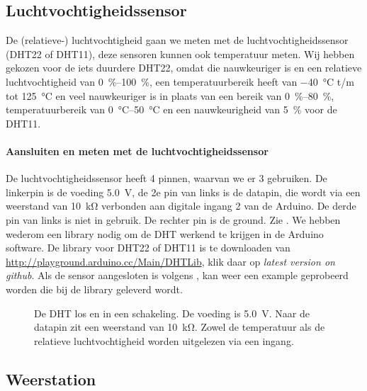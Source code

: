 \subsection{Luchtvochtigheidssensor}

De (relatieve-) luchtvochtigheid gaan we meten met de
luchtvochtigheidssensor (DHT22 of DHT11), deze sensoren kunnen ook
temperatuur meten. Wij hebben gekozen voor de iets duurdere DHT22, omdat
die nauwkeuriger is en een relatieve luchtvochtigheid van
\SIrange{0}{100}{\percent}, een temperatuurbereik heeft van
\SI{-40}{\degreeCelsius} t/m tot \SI{125}{\degreeCelsius} en veel
nauwkeuriger is in plaats van een bereik van \SIrange{0}{80}{\percent},
temperatuurbereik van \SIrange{0}{50}{\degreeCelsius} en een
nauwkeurigheid van \SI{5}{\percent} voor de DHT11.

\paragraph{Aansluiten en meten met de luchtvochtigheidssensor}

De luchtvochtigheidssensor heeft 4 pinnen, waarvan we er 3 gebruiken. De
linkerpin is de voeding \SI{5.0}{\volt}, de 2e pin van links is de
datapin, die wordt via een weerstand van \SI{10}{\kilo\ohm} verbonden
aan digitale ingang 2 van de Arduino. De derde pin van links is niet in
gebruik. De rechter pin is de ground. Zie . We hebben
wederom een library nodig om de DHT werkend te krijgen in de Arduino
software. De library voor DHT22 of DHT11 is te downloaden van
\url{http://playground.arduino.cc/Main/DHTLib}, klik daar op
\emph{latest version on github}. Als de sensor aangesloten is volgens
, kan weer een example geprobeerd
worden die bij de library geleverd wordt.

\begin{figure}
    \centering
    \hfill
    \caption{De DHT los en in een schakeling. De voeding is \SI{5.0}{\volt}. 
    Naar de datapin zit een weerstand van \SI{10}{\kilo\ohm}. Zowel de
    temperatuur als de relatieve luchtvochtigheid worden uitgelezen via
    een ingang.}
\end{figure}

\subsection{Weerstation}

